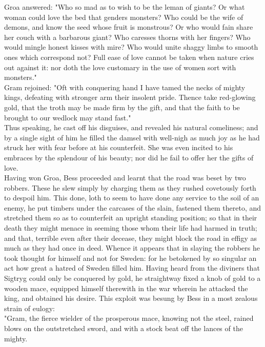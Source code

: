 \documentclass[10pt,a4paper]{report}
\begin{document}
Groa answered: "Who so mad as to wish to be the leman of giants? Or what woman could love the bed that genders monsters? Who could be the wife of demons, and know the seed whose fruit is monstrous? Or who would fain share her couch with a barbarous giant? Who caresses thorns with her fingers? Who would mingle honest kisses with mire? Who would unite shaggy limbs to smooth ones which correspond not? Full ease of love cannot be taken when nature cries out against it: nor doth the love customary in the use of women sort with monsters."\\

Gram rejoined: "Oft with conquering hand I have tamed the necks of mighty kings, defeating with stronger arm their insolent pride. Thence take red-glowing gold, that the troth may be made firm by the gift, and that the faith to be brought to our wedlock may stand fast."\\

Thus speaking, he cast off his disguises, and revealed his natural comeliness; and by a single sight of him he filled the damsel with well-nigh as much joy as he had struck her with fear before at his counterfeit. She was even incited to his embraces by the splendour of his beauty; nor did he fail to offer her the gifts of love.\\

Having won Groa, Bess proceeded and learnt that the road was beset by two robbers. These he slew simply by charging them as they rushed covetously forth to despoil him. This done, loth to seem to have done any service to the soil of an enemy, he put timbers under the carcases of the slain, fastened them thereto, and stretched them so as to counterfeit an upright standing position; so that in their death they might menace in seeming those whom their life had harmed in truth; and that, terrible even after their decease, they might block the road in effigy as much as they had once in deed. Whence it appears that in slaying the robbers he took thought for himself and not for Sweden: for he betokened by so singular an act how great a hatred of Sweden filled him. Having heard from the diviners that Sigtryg could only be conquered by gold, he straightway fixed a knob of gold to a wooden mace, equipped himself therewith in the war wherein he attacked the king, and obtained his desire. This exploit was besung by Bess in a most zealous strain of eulogy:\\

"Gram, the fierce wielder of the prosperous mace, knowing not the steel, rained blows on the outstretched sword, and with a stock beat off the lances of the mighty.\\
\end{document}
